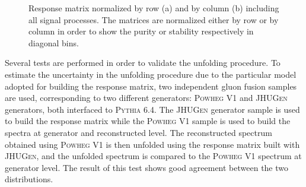 \begin{figure}[htb]
\centering
{}
\caption{Response matrix normalized by row (a) and  by column (b) including all signal processes. The matrices are normalized either by row or by column in order to show the purity or stability respectively in diagonal bins.}\label{fig:matrix}
\end{figure}

Several tests are performed in order to validate the unfolding procedure. To estimate the uncertainty in the unfolding procedure due to the
particular model adopted for building the response matrix, two independent gluon fusion samples are used, corresponding to two different generators: \textsc{Powheg V1} and \textsc{JHUGen} generators, both interfaced to \textsc{Pythia 6.4}.
The \textsc{JHUGen} generator sample is used to build the response matrix while the
\textsc{Powheg V1} sample is used to build the \pth spectra at generator and reconstructed level. The reconstructed spectrum obtained using \textsc{Powheg V1} is then unfolded using the response matrix built with \textsc{JHUGen}, and the unfolded spectrum is compared to the \textsc{Powheg V1} spectrum at generator level. The result of this test shows good agreement between the two distributions.

